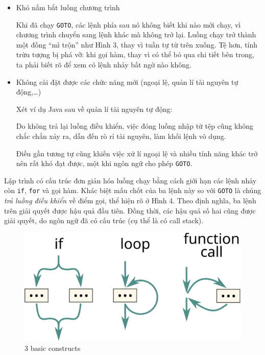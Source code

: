 \begin{itemize}
  \item
        Khó nắm bắt luồng chương trình

        Khi đã chạy \texttt{GOTO}, các lệnh phía sau nó không biết khi nào mới
        chạy, vì chương trình chuyển sang lệnh khác mà không trở lại. Luồng
        chạy trở thành một đống ``mì trộn'' như Hình 3, thay vì tuần tự từ
        trên xuống. Tệ hơn, tính trừu tượng bị phá vỡ: khi gọi hàm, thay vì có
        thể bỏ qua chi tiết bên trong, ta phải biết rõ để xem có lệnh nhảy bất
        ngờ nào không.
  \item
        Không cài đặt được các chức năng mới (ngoại lệ, quản lí tài nguyên tự
        động,\ldots)

        Xét ví dụ Java sau về quản lí tài nguyên tự động:

        \begin{Shaded}
          \begin{Highlighting}[]
            \NormalTok{ (} \NormalTok{(} \NormalTok{(}\NormalTok{))) \{}
            \NormalTok{();    }
            \NormalTok{\}}
          \end{Highlighting}
        \end{Shaded}

        Do không trả lại luồng điều khiển, việc đóng luồng nhập từ tệp cũng
        không chắc chắn xảy ra, dẫn đến rò rỉ tài nguyên, làm khối lệnh vô
        dụng.

        Điều gần tương tự cũng khiến việc xử lí ngoại lệ và nhiều tính năng
        khác trở nên rất khó đạt được, một khi ngôn ngữ cho phép
        \texttt{GOTO}.
\end{itemize}

Lập trình có cấu trúc đơn giản hóa luồng chạy bằng cách giới hạn các
lệnh nhảy còn \texttt{if}, \texttt{for} và gọi hàm. Khác biệt mấu chốt
của ba lệnh này so với \texttt{GOTO} là chúng \emph{trả luồng điều
  khiển} về điểm gọi, thể hiện rõ ở Hình 4. Theo định nghĩa, ba lệnh trên
giải quyết được hậu quả đầu tiên. Đồng thời, các hậu quả số hai cũng
được giải quyết, do ngôn ngữ đã có cấu trúc (cụ thể là có call stack).

\begin{figure}
  \centering
  \includegraphics{../images/control-schematics.svg}
  \caption{3 basic constructs}
\end{figure}

